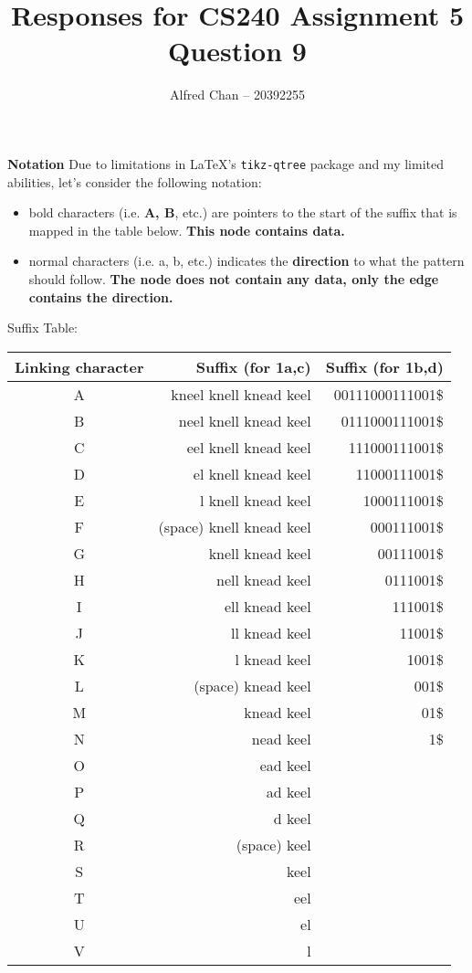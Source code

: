 \documentclass[12pt]{article}
\title{Responses for CS240 Assignment 5 Question 9}
\author{Alfred Chan -- 20392255}
\begin{document}
\maketitle
{\bf Notation} Due to limitations in \LaTeX's \texttt{tikz-qtree} package and my limited abilities, let's consider the following notation:
\begin{itemize}
\item bold characters (i.e. {\bf A, B}, etc.) are pointers to the start of the suffix that is mapped in the table below. {\bf This node contains data.}
\item normal characters (i.e. a, b, etc.) indicates the {\bf direction} to what the pattern should follow. {\bf The node does not contain any data, only the edge contains the direction.}
\end{itemize}

Suffix Table:\\
\begin{tabular}{c|r|r}
Linking character & Suffix (for 1a,c) & Suffix (for 1b,d)\\\hline
A & kneel knell knead keel		& 00111000111001\$\\\hline
B & neel knell knead keel			& 0111000111001\$\\\hline
C & eel knell knead keel			& 111000111001\$\\\hline
D & el knell knead keel				& 11000111001\$\\\hline
E & l knell knead keel				& 1000111001\$\\\hline
F & (space) knell knead keel	& 000111001\$\\\hline
G & knell knead keel					& 00111001\$\\\hline
H & nell knead keel						& 0111001\$\\\hline
I & ell knead keel						& 111001\$\\\hline
J & ll knead keel							& 11001\$\\\hline
K & l knead keel							& 1001\$\\\hline
L & (space) knead keel				& 001\$\\\hline
M & knead keel								& 01\$\\\hline
N & nead keel									& 1\$\\\hline
O & ead keel\\\hline
P & ad keel\\\hline
Q & d keel\\\hline
R & (space) keel\\\hline
S & keel\\\hline
T & eel\\\hline
U & el\\\hline
V & l\\\hline
\end{tabular}\\
\end{document}
